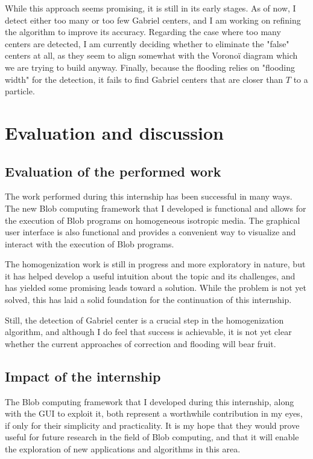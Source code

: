 \documentclass[11pt,a4paper]{report}
\begin{document}
While this approach seems promising, it is still in its early stages. As of now, I detect either too many or too few Gabriel centers, and I am working on refining the algorithm to improve its accuracy. Regarding the case where too many centers are detected, I am currently deciding whether to eliminate the "false" centers at all, as they seem to align somewhat with the Voronoï diagram which we are trying to build anyway. Finally, because the flooding relies on "flooding width" for the detection, it fails to find Gabriel centers that are closer than $T$ to a particle.

\chapter{Evaluation and discussion}

\section{Evaluation of the performed work}

The work performed during this internship has been successful in many ways. The new Blob computing framework that I developed is functional and allows for the execution of Blob programs on homogeneous isotropic media. The graphical user interface is also functional and provides a convenient way to visualize and interact with the execution of Blob programs.

The homogenization work is still in progress and more exploratory in nature, but it has helped develop a useful intuition about the topic and its challenges, and has yielded some promising leads toward a solution. While the problem is not yet solved, this has laid a solid foundation for the continuation of this internship.

Still, the detection of Gabriel center is a crucial step in the homogenization algorithm, and although I do feel that success is achievable, it is not yet clear whether the current approaches of correction and flooding will bear fruit.

\section{Impact of the internship}

The Blob computing framework that I developed during this internship, along with the GUI to exploit it, both represent a worthwhile contribution in my eyes, if only for their simplicity and practicality. It is my hope that they would prove useful for future research in the field of Blob computing, and that it will enable the exploration of new applications and algorithms in this area.
\end{document}
